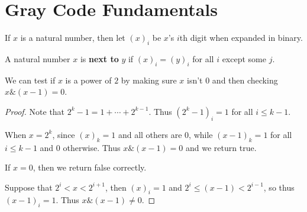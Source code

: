 %

\chapter{Gray Code Fundamentals}

\begin{definition}
    If $x$ is a natural number, then let $(x)_i$ be $x$'s $i$th digit when expanded in binary.
    \label{def:test_digit}
\end{definition}

\begin{definition}
    \label{def:next_to}
    A natural number $x$ is \textbf{next to} $y$ if $(x)_i = (y)_i$ for all $i$ except some $j$.
\end{definition}

\begin{theorem}
    \label{thm:bitwise_test_power_of_two}
    We can test if $x$ is a power of $2$ by making sure $x$ isn't 0 and then checking $x \& (x - 1) = 0$.
\end{theorem}

\begin{proof}
    Note that $2^k - 1 = 1 + \cdots + 2^{k-1}$. Thus $(2^k - 1)_i = 1$ for
    all $i \le {k-1}$.

    When $x = 2^k$, since $(x)_k = 1$ and all others are $0$, while $(x - 1)_k = 1$ for all $i \le k-1$ and $0$ otherwise. Thus $x \& (x - 1) = 0$ and we return true.

    If $x = 0$, then we return false correctly.
    
    Suppose that $2^i < x < 2^{i+1}$, then $(x)_i = 1$ and $2^i \le (x - 1) < 2^{i-1}$,
    so thus $(x-1)_i = 1$. Thus $x \& (x - 1) \neq 0$.
\end{proof}

